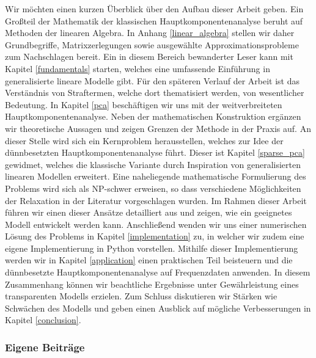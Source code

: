 Wir möchten einen kurzen Überblick über den Aufbau dieser Arbeit geben. Ein Großteil der Mathematik der klassischen Hauptkomponentenanalyse beruht auf Methoden der linearen Algebra. In Anhang \ref{linear_algebra} stellen wir daher Grundbegriffe, Matrixzerlegungen sowie ausgewählte Approximationsprobleme zum Nachschlagen bereit. Ein in diesem Bereich bewanderter Leser kann mit Kapitel \ref{fundamentals} starten, welches eine umfassende Einführung in generalisierte lineare Modelle gibt. Für den späteren Verlauf der Arbeit ist das Verständnis von Straftermen, welche dort thematisiert werden, von wesentlicher Bedeutung. In Kapitel \ref{pca} beschäftigen wir uns mit der weitverbreiteten Hauptkomponentenanalyse. Neben der mathematischen Konstruktion ergänzen wir theoretische Aussagen und zeigen Grenzen der Methode in der Praxis auf. An dieser Stelle wird sich ein Kernproblem herausstellen, welches zur Idee der dünnbesetzten Hauptkomponentenanalyse führt. Dieser ist Kapitel \ref{sparse_pca} gewidmet, welches die klassische Variante durch Inspiration von generalisierten linearen Modellen erweitert. Eine naheliegende mathematische Formulierung des Problems wird sich als NP-schwer erweisen, so dass verschiedene Möglichkeiten der Relaxation in der Literatur vorgeschlagen wurden. Im Rahmen dieser Arbeit führen wir einen dieser Ansätze detailliert aus und zeigen, wie ein geeignetes Modell entwickelt werden kann. Anschließend wenden wir uns einer numerischen Lösung des Problems in Kapitel \ref{implementation} zu, in welcher wir zudem eine eigene Implementierung in Python vorstellen. Mithilfe dieser Implementierung werden wir in Kapitel \ref{application} einen praktischen Teil beisteuern und die dünnbesetzte Hauptkomponentenanalyse auf Frequenzdaten anwenden. In diesem Zusammenhang können wir beachtliche Ergebnisse unter Gewährleistung eines transparenten Modells erzielen. Zum Schluss diskutieren wir Stärken wie Schwächen des Modells und geben einen Ausblick auf mögliche Verbesserungen in Kapitel \ref{conclusion}.




\subsubsection{Eigene Beiträge}

